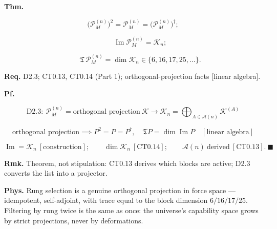 \begin{theorem}\label{tag:CT2-2}
\textbf{Thm.}

\[
\bigl(\mathcal P_M^{(n)}\bigr)^2=\mathcal P_M^{(n)}=\bigl(\mathcal P_M^{(n)}\bigr)^\dagger;
\]

\[
\qquad \operatorname{Im}\mathcal P_M^{(n)}=\mathcal K_n;
\]

\[
\qquad \mathfrak T\,\mathcal P_M^{(n)}=\dim\mathcal K_n\in\{6,16,17,25,\dots\}.
\]

\textbf{Req.} D2.3; CT0.13, CT0.14 (Part 1); orthogonal-projection facts [linear algebra].

\textbf{Pf.}

\[
\mathrm{D2.3}:\ \mathcal P_M^{(n)}=\text{orthogonal projection}\ \mathcal K\to\mathcal K_n=\bigoplus_{A\in\mathcal A(n)}\mathcal K^{(A)}
\]

\[
\text{orthogonal projection}\implies P^2=P=P^\dagger,\quad\mathfrak T P=\dim\operatorname{Im}P\quad[\text{linear algebra}]
\]

\[
\operatorname{Im}=\mathcal K_n\ [\text{construction}];\qquad\dim\mathcal K_n\ [\mathrm{CT0.14}];\qquad\mathcal A(n)\ \text{derived}\ [\mathrm{CT0.13}].\ \blacksquare
\]

\textbf{Rmk.} Theorem, not stipulation: CT0.13 derives which blocks are active; D2.3 converts the list into a projector.

\textbf{Phys.} Rung selection is a genuine orthogonal projection in force space — idempotent, self-adjoint, with trace equal to the block dimension $6/16/17/25$. Filtering by rung twice is the same as once: the universe’s capability space grows by strict projections, never by deformations.

\end{theorem}

